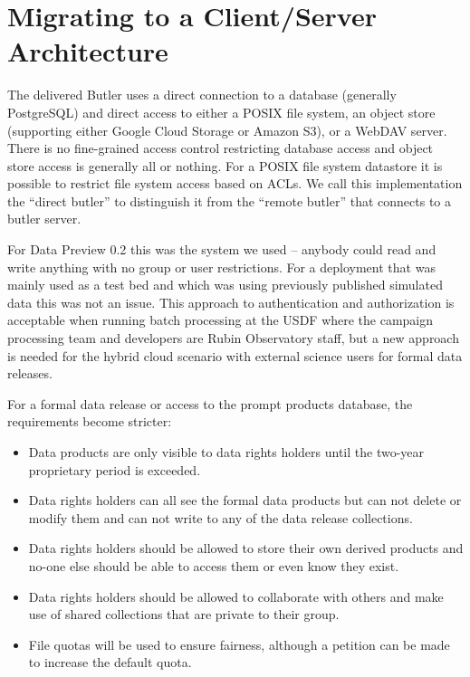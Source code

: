 \section{Migrating to a Client/Server Architecture}

The delivered Butler uses a direct connection to a database (generally PostgreSQL) and direct access to either a POSIX file system, an object store (supporting either Google Cloud Storage or Amazon S3), or a WebDAV server.
There is no fine-grained access control restricting database access and object store access is generally all or nothing.
For a POSIX file system datastore it is possible to restrict file system access based on ACLs.
We call this implementation the ``direct butler'' to distinguish it from the ``remote butler'' that connects to a butler server.

For Data Preview 0.2 \cite{RTN-041} this was the system we used -- anybody could read and write anything with no group or user restrictions.
For a deployment that was mainly used as a test bed and which was using previously published simulated data this was not an issue.
This approach to authentication and authorization is acceptable when running batch processing at the USDF where the campaign processing team and developers are Rubin Observatory staff, but a new approach is needed for the hybrid cloud scenario with external science users for formal data releases.

For a formal data release or access to the prompt products database, the requirements become stricter:

\begin{itemize}
\item Data products are only visible to data rights holders until the two-year proprietary period is exceeded.
\item Data rights holders can all see the formal data products but can not delete or modify them and can not write to any of the data release collections.
\item Data rights holders should be allowed to store their own derived products and no-one else should be able to access them or even know they exist.
\item Data rights holders should be allowed to collaborate with others and make use of shared collections that are private to their group.
\item File quotas will be used to ensure fairness, although a petition can be made to increase the default quota.
\end{itemize}

